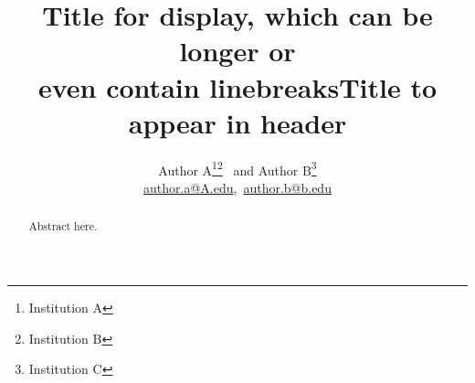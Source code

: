 \documentclass[14pt,twoside]{extarticle}
\begin{document}
\thispagestyle{empty}
\title{Title for display, which can be longer or\\even contain linebreaks}
\author{Author A\footnote{\label{inst_a}Institution A}\mfs\footnote{Institution B}~%
  and Author B\mfs\footnote{Institution C}\\%
  {\footnotesize\url{author.a@A.edu},\, \url{author.b@b.edu}}}
\maketitle

\title{Title to appear in header}
\makeatletter
\let\headertitle\@title
\makeatother

\begin{abstract}
Abstract here.
\end{abstract}

\let\footnote=\endnote

\bigskip
\theendnotes
\end{document}
